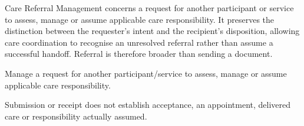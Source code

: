 Care Referral Management concerns a request for another participant or service to assess, manage or assume applicable care responsibility. It preserves the distinction between the requester's intent and the recipient's disposition, allowing care coordination to recognise an unresolved referral rather than assume a successful handoff. Referral is therefore broader than sending a document.



Manage a request for another participant/\allowbreak{}service to assess, manage or assume applicable care responsibility.



Submission or receipt does not establish acceptance, an appointment, delivered care or responsibility actually assumed.


